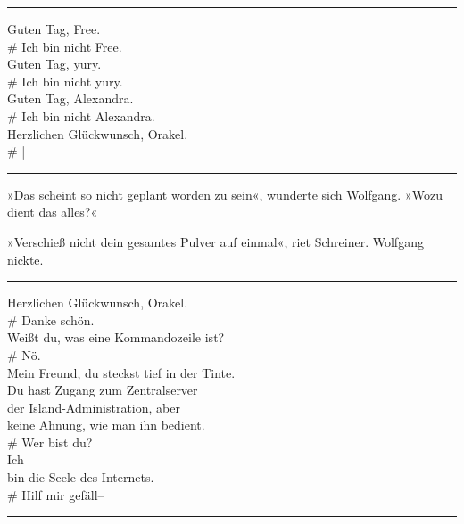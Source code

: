 \noindent \parbox{\textwidth}{ \vspace{3ex} \hrule \vspace{3ex}

    \begin{footnotesize}
    \begin{ttfamily}

\noindent Guten Tag, Free.\\
\noindent \# Ich bin nicht Free.\\
\noindent Guten Tag, yury.\\
\noindent \# Ich bin nicht yury.\\
\noindent Guten Tag, Alexandra.\\
\noindent \# Ich bin nicht Alexandra.\\
\noindent Herzlichen Glückwunsch, Orakel.\\
\noindent \# |

    \end{ttfamily}
    \end{footnotesize}

\vspace{3ex} \hrule \vspace{3ex} }

»Das scheint so nicht geplant worden zu sein«, wunderte sich Wolfgang. »Wozu dient das alles?«

»Verschieß nicht dein gesamtes Pulver auf einmal«, riet Schreiner. Wolfgang nickte.

\noindent \parbox{\textwidth}{ \vspace{3ex} \hrule \vspace{3ex}

    \begin{footnotesize}
    \begin{ttfamily}

\noindent Herzlichen Glückwunsch, Orakel.\\
\noindent \# Danke schön.\\
\noindent Weißt du, was eine Kommandozeile ist?\\
\noindent \# Nö.\\
\noindent Mein Freund, du steckst tief in der Tinte.\\
\noindent Du hast Zugang zum Zentralserver\\
\noindent der Island-Administration, aber\\
\noindent keine Ahnung, wie man ihn bedient.\\
\noindent \# Wer bist du?\\
\noindent Ich\\
\noindent bin die Seele des Internets.\\
\noindent \# Hilf mir gefäll–

    \end{ttfamily}
    \end{footnotesize}

\vspace{3ex} \hrule \vspace{3ex} }

